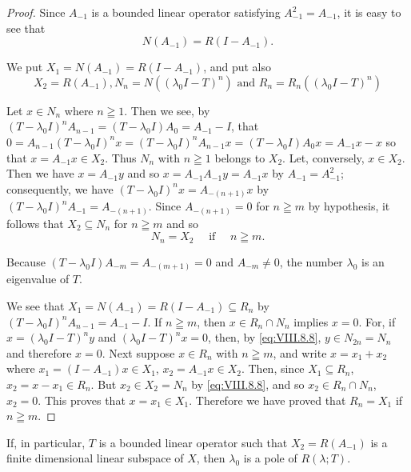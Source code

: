 \begin{proof}
 Since $A_{-1}$ is a bounded linear operator satisfying $A_{-1}^2 = A_{-1}$, it is easy to see that 
\begin{equation}\label{eq:VIII.8.6}
N (A _{-1}) = R (I - A _{-1}). \end{equation}

We put $X_{1} = N(A_{-1}) = R(I - A_{-1})$, and put also 
\begin{equation}\label{eq:VIII.8.7}
X _{2} = R (A _{-1}), N _{n} = N ((\lambda_{0} I - T) ^{n}) \text{ and } R _{n} = R _{n} ((\lambda_{0} I - T) ^{n})
\end{equation}

Let $x \in N_n$ where $n \geqq 1$. Then we see, by $(T - \lambda_0 I)^n A_{n-1} = (T - \lambda_0 I) A_0 = A_{-1} - I$, that $0 = A_{n-1}(T - \lambda_0 I)^n x = (T - \lambda_0 I)^n A_{n-1} x = (T - \lambda_0 I) A_0 x = A_{-1} x - x$ so that $x = A_{-1} x \in X_2$. Thus $N_n$ with $n \geqq 1$ belongs to $X_2$. Let, conversely, $x \in X_2$. Then we have $x = A_{-1} y$ and so $x = A_{-1} A_{-1} y = A_{-1} x$ by $A_{-1} = A_{-1}^2$; consequently, we have $(T - \lambda_0 I)^n x = A_{-(n+1)} x$ by $(T - \lambda_0 I)^n A_{-1} = A_{-(n+1)}$. Since $A_{-(n+1)} = 0$ for $n \geqq m$ by hypothesis, it follows that $X_2 \subseteq N_n$ for $n \geqq m$ and so 
\begin{equation}\label{eq:VIII.8.8}
N _{n} = X _{2} \quad \text{ if } \quad n \geqq m.
\end{equation}

Because $(T - \lambda_0I)A_{-m} = A_{-(m+1)} = 0$ and $A_{-m}\neq 0$, the number $\lambda_0$ is an eigenvalue of $T$. 


We see that $X_{1} = N(A_{-1}) = R(I - A_{-1}) \subseteq R_{n}$ by $(T - \lambda_0 I)^n A_{n-1} = A_{-1} - I$. If $n \geqq m$, then $x \in R_n \cap N_n$ implies $x = 0$. For, if $x = (\lambda_0 I - T)^n y$ and $(\lambda_0 I - T)^n x = 0$, then, by \eqref{eq:VIII.8.8}, $y \in N_{2n} = N_n$ and therefore $x = 0$. Next suppose $x \in R_n$ with $n \geqq m$, and write $x = x_1 + x_2$ where $x_1 = (I - A_{-1})x \in X_1$, $x_2 = A_{-1}x \in X_2$. Then, since $X_1 \subseteq R_n$, $x_2 = x - x_1 \in R_n$. But $x_2 \in X_2 = N_n$ by \eqref{eq:VIII.8.8}, and so $x_2 \in R_n \cap N_n$, $x_2 = 0$. This proves that $x = x_1 \in X_1$. Therefore we have proved that $R_n = X_1$ if $n \geqq m$.
\end{proof}

\begin{theorem}\label{thm:VIII.8.Theorem.4} If, in particular, $T$ is a bounded linear operator such that $X_{2} = R(A_{-1})$ is a finite dimensional linear subspace of $X$, then $\lambda_{0}$ is a pole of $R(\lambda; T)$. 
\end{theorem}

